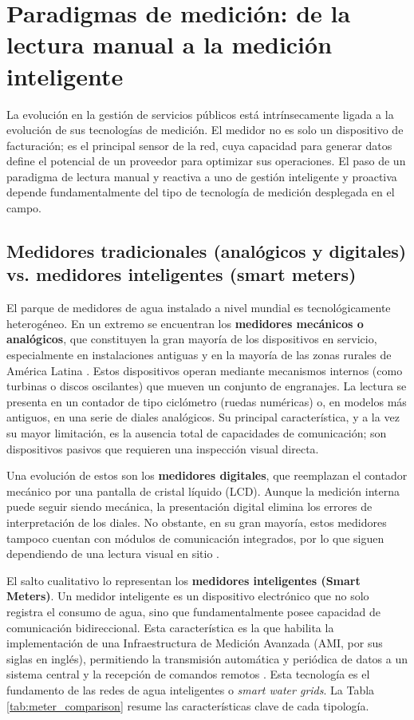 \section{Paradigmas de medición: de la lectura manual a la medición inteligente}
\label{sec:metering_paradigms}

La evolución en la gestión de servicios públicos está intrínsecamente ligada a la evolución de sus tecnologías de medición. El medidor no es solo un dispositivo de facturación; es el principal sensor de la red, cuya capacidad para generar datos define el potencial de un proveedor para optimizar sus operaciones. El paso de un paradigma de lectura manual y reactiva a uno de gestión inteligente y proactiva depende fundamentalmente del tipo de tecnología de medición desplegada en el campo.

\subsection{Medidores tradicionales (analógicos y digitales) vs. medidores inteligentes (smart meters)}
\label{ssec:meter_types}

El parque de medidores de agua instalado a nivel mundial es tecnológicamente heterogéneo. En un extremo se encuentran los \textbf{medidores mecánicos o analógicos}, que constituyen la gran mayoría de los dispositivos en servicio, especialmente en instalaciones antiguas y en la mayoría de las zonas rurales de América Latina \parencite{Salomon2022ImageBased, Santiago2020Deployment}. Estos dispositivos operan mediante mecanismos internos (como turbinas o discos oscilantes) que mueven un conjunto de engranajes. La lectura se presenta en un contador de tipo ciclómetro (ruedas numéricas) o, en modelos más antiguos, en una serie de diales analógicos. Su principal característica, y a la vez su mayor limitación, es la ausencia total de capacidades de comunicación; son dispositivos pasivos que requieren una inspección visual directa.

Una evolución de estos son los \textbf{medidores digitales}, que reemplazan el contador mecánico por una pantalla de cristal líquido (LCD). Aunque la medición interna puede seguir siendo mecánica, la presentación digital elimina los errores de interpretación de los diales. No obstante, en su gran mayoría, estos medidores tampoco cuentan con módulos de comunicación integrados, por lo que siguen dependiendo de una lectura visual en sitio \parencite{Peng2023Deep}.

El salto cualitativo lo representan los \textbf{medidores inteligentes (Smart Meters)}. Un medidor inteligente es un dispositivo electrónico que no solo registra el consumo de agua, sino que fundamentalmente posee capacidad de comunicación bidireccional. Esta característica es la que habilita la implementación de una Infraestructura de Medición Avanzada (AMI, por sus siglas en inglés), permitiendo la transmisión automática y periódica de datos a un sistema central y la recepción de comandos remotos \parencite{Laroca2021Towards, IADB2022}. Esta tecnología es el fundamento de las redes de agua inteligentes o \textit{smart water grids}. La Tabla \ref{tab:meter_comparison} resume las características clave de cada tipología.


